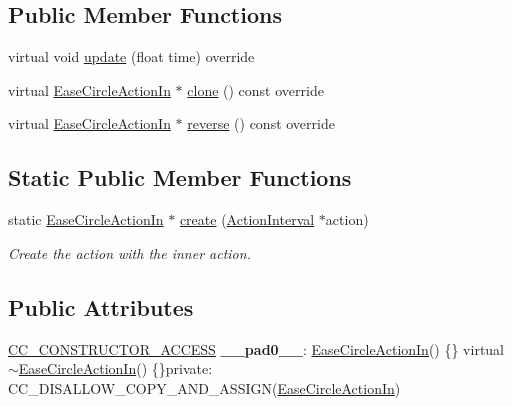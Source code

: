 \subsection*{Public Member Functions}
\begin{DoxyCompactItemize}
\item 
virtual void \hyperlink{classEaseCircleActionIn_a8d48762a47eb738ca2b8fb644182e91b}{update} (float time) override
\item 
virtual \hyperlink{classEaseCircleActionIn}{Ease\+Circle\+Action\+In} $\ast$ \hyperlink{classEaseCircleActionIn_a5660f86732520e32f34649644ac716e6}{clone} () const override
\item 
virtual \hyperlink{classEaseCircleActionIn}{Ease\+Circle\+Action\+In} $\ast$ \hyperlink{classEaseCircleActionIn_ac395a5073afd9b357e7bd02f37d65ff3}{reverse} () const override
\end{DoxyCompactItemize}
\subsection*{Static Public Member Functions}
\begin{DoxyCompactItemize}
\item 
static \hyperlink{classEaseCircleActionIn}{Ease\+Circle\+Action\+In} $\ast$ \hyperlink{classEaseCircleActionIn_a56d06aeb50c566b47b4c0a15541e6c20}{create} (\hyperlink{classActionInterval}{Action\+Interval} $\ast$action)
\begin{DoxyCompactList}\small\item\em Create the action with the inner action. \end{DoxyCompactList}\end{DoxyCompactItemize}
\subsection*{Public Attributes}
\begin{DoxyCompactItemize}
\item 
\mbox{\label{classEaseCircleActionIn_aa911a59adb2c92a0b428b7e2ec8321c6}} 
\hyperlink{_2cocos2d_2cocos_2base_2ccConfig_8h_a25ef1314f97c35a2ed3d029b0ead6da0}{C\+C\+\_\+\+C\+O\+N\+S\+T\+R\+U\+C\+T\+O\+R\+\_\+\+A\+C\+C\+E\+SS} {\bfseries \+\_\+\+\_\+pad0\+\_\+\+\_\+}\+: \hyperlink{classEaseCircleActionIn}{Ease\+Circle\+Action\+In}() \{\} virtual $\sim$\hyperlink{classEaseCircleActionIn}{Ease\+Circle\+Action\+In}() \{\}private\+: C\+C\+\_\+\+D\+I\+S\+A\+L\+L\+O\+W\+\_\+\+C\+O\+P\+Y\+\_\+\+A\+N\+D\+\_\+\+A\+S\+S\+I\+GN(\hyperlink{classEaseCircleActionIn}{Ease\+Circle\+Action\+In})
\end{DoxyCompactItemize}
